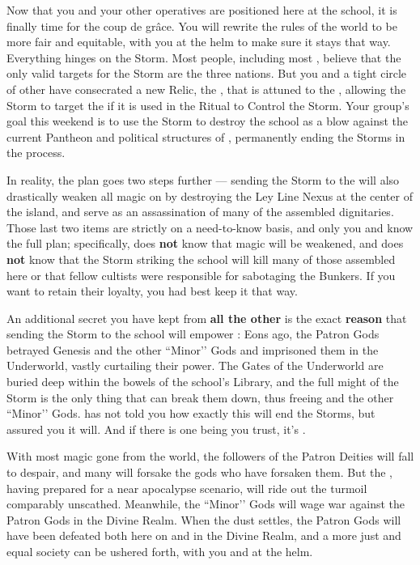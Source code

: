\documentclass[char]{GL2020}
\begin{document}
Now that you and your other operatives are positioned here at the school, it is finally time for the coup de grâce. You will rewrite the rules of the world to be more fair and equitable, with you at the helm to make sure it stays that way. Everything hinges on the Storm. Most people, including most \pGoaties{}, believe that the only valid targets for the Storm are the three nations. But you and a tight circle of other \pGoaties{} have consecrated a new Relic, the \iHorseshoe{}, that is attuned to the \pSchool{}, allowing the Storm to target the \pSc{} if it is used in the Ritual to Control the Storm. Your group's goal this weekend is to use the Storm to destroy the school as a blow against the current Pantheon and political structures of \pEarth{}, permanently ending the Storms in the process. 

In reality, the plan goes two steps further — sending the Storm to the \pSc{} will also drastically weaken all magic on \pEarth{} by destroying the Ley Line Nexus at the center of the island, and serve as an assassination of many of the assembled dignitaries. Those last two items are strictly on a need-to-know basis, and only you and \cChupSecond{} know the full plan; specifically, \cChupInventor{} does \textbf{not} know that magic will be weakened, and \cChupStudent{} does \textbf{not} know that the Storm striking the school will kill many of those assembled here or that \cChupStudent{\their} fellow cultists were responsible for sabotaging the Bunkers. If you want to retain their loyalty, you had best keep it that way. 

An additional secret you have kept from \textbf{all the other} \pGoaties{} is the exact \textbf{reason} that sending the Storm to the school will empower \cGenesis{}: Eons ago, the Patron Gods betrayed Genesis and the other ``Minor’’ Gods and imprisoned them in the Underworld, vastly curtailing their power. The Gates of the Underworld are buried deep within the bowels of the school’s Library, and the full might of the Storm is the only thing that can break them down, thus freeing \cGenesis{} and the other ``Minor’’ Gods. \cGenesis{} has not told you how exactly this will end the Storms, but \cGenesis{\theyhave} assured you it will. And if there is one being you trust, it's \cGenesis{}.

With most magic gone from the world, the followers of the Patron Deities will fall to despair, and many will forsake the gods who have forsaken them. But the \pGoaties{}, having prepared for a near apocalypse scenario, will ride out the turmoil comparably unscathed. Meanwhile, the ``Minor’’ Gods will wage war against the Patron Gods in the Divine Realm. When the dust settles, the Patron Gods will have been defeated both here on \pEarth{} and in the Divine Realm, and a more just and equal society can be ushered forth, with you and \cGenesis{} at the helm.
\end{document}
